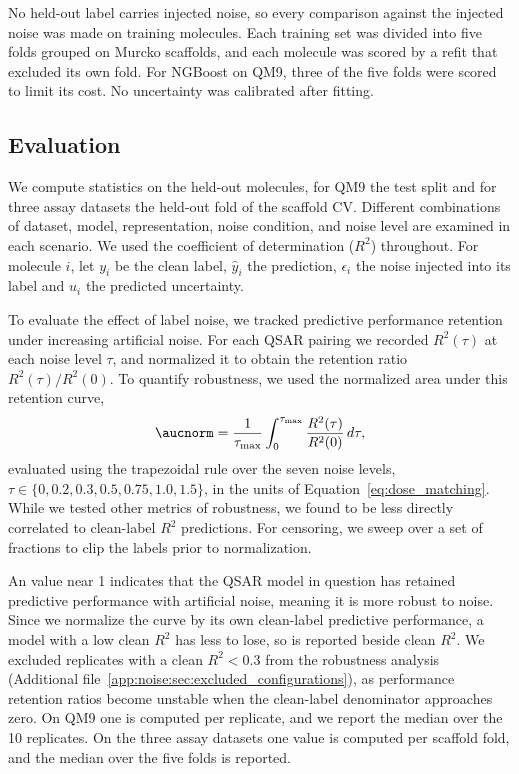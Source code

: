 No held-out label carries injected noise, so every comparison against the injected noise was made on
training molecules. Each training set was divided into five folds grouped on Murcko scaffolds, and each
molecule was scored by a refit that excluded its own fold. For NGBoost on QM9, three of the five folds
were scored to limit its cost. No uncertainty was calibrated after fitting.


\subsection{Evaluation}
We compute statistics on the held-out molecules, for QM9 the test split and for three assay datasets the held-out fold of the scaffold CV. Different combinations of dataset, model, representation, noise condition, and noise level are examined in each scenario. We used the coefficient of determination ($R^2$) throughout. For molecule $i$, let $y_i$ be the clean label, $\hat{y}_i$ the prediction, $\epsilon_i$ the noise injected into its label and $u_i$ the predicted uncertainty.

To evaluate the effect of label noise, we tracked predictive performance retention under increasing artificial noise. For each QSAR pairing we recorded $R^2(\tau)$ at each noise level $\tau$, and normalized it to obtain the retention ratio $R^2(\tau)/R^2(0)$. To quantify robustness, we used the normalized area under this retention curve,
\begin{equation}
\aucnorm = \frac{1}{\tau_{\max}} \int_0^{\tau_{\max}} \frac{R^2(\tau)}{R^2(0)}\, d\tau,
\label{eq:aucnorm}
\end{equation}
evaluated using the trapezoidal rule over the seven noise levels, $\tau \in \{0,\allowbreak 0.2,\allowbreak 0.3,\allowbreak 0.5,\allowbreak 0.75,\allowbreak 1.0,\allowbreak 1.5\}$, in the units of Equation~\ref{eq:dose_matching}. While we tested other metrics of robustness, we found \aucnorm{} to be less directly correlated to clean-label $R^2$ predictions. For censoring, we sweep over a set of fractions to clip the labels prior to normalization. 

An \aucnorm{} value near 1 indicates that the QSAR model in question has retained predictive performance with artificial noise, meaning it is more robust to noise. Since we normalize the curve by its own clean-label predictive performance, a model with a low clean $R^2$ has less to lose, so \aucnorm{} is reported beside clean $R^2$. We excluded replicates with a clean $R^2 < 0.3$ from the robustness analysis (Additional file~\ref{app:noise:sec:excluded_configurations}), as performance retention ratios become unstable when the clean-label denominator approaches zero. On QM9 one \aucnorm{} is computed per replicate, and we report the median over the 10 replicates. On the three assay datasets one value is computed per scaffold fold, and the median over the five folds is reported. 

